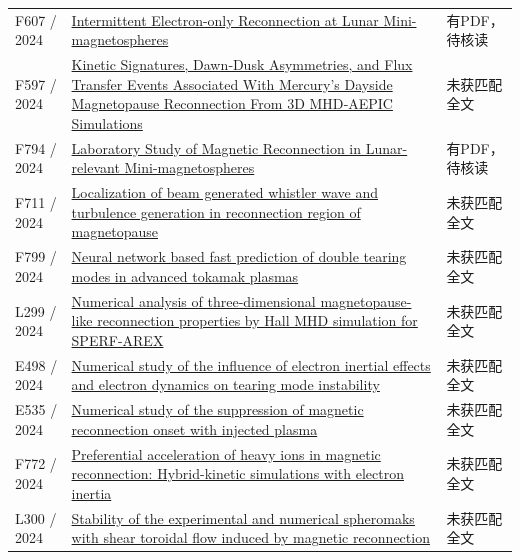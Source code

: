 \begin{longtable}{P{24mm}P{97mm}P{27mm}}
F607 / 2024 & \href{https://doi.org/10.3847/2041-8213/ad2774}{Intermittent Electron-only Reconnection at Lunar Mini-magnetospheres} & 有PDF，待核读\\

F597 / 2024 & \href{https://doi.org/10.1029/2024ja032669}{Kinetic Signatures,  Dawn‐Dusk Asymmetries,  and Flux Transfer Events Associated With Mercury's Dayside Magnetopause Reconnection From 3D MHD‐AEPIC Simulations} & 未获匹配全文\\

F794 / 2024 & \href{https://doi.org/10.3847/1538-4357/ad4fff}{Laboratory Study of Magnetic Reconnection in Lunar-relevant Mini-magnetospheres} & 有PDF，待核读\\

F711 / 2024 & \href{https://doi.org/10.1063/5.0169397}{Localization of beam generated whistler wave and turbulence generation in reconnection region of magnetopause} & 未获匹配全文\\

F799 / 2024 & \href{https://doi.org/10.1063/5.0229910}{Neural network based fast prediction of double tearing modes in advanced tokamak plasmas} & 未获匹配全文\\

L299 / 2024 & \href{https://doi.org/10.1063/5.0213566}{Numerical analysis of three-dimensional magnetopause-like reconnection properties by Hall MHD simulation for SPERF-AREX} & 未获匹配全文\\

E498 / 2024 & \href{https://doi.org/10.1088/1361-6587/ad4e66}{Numerical study of the influence of electron inertial effects and electron dynamics on tearing mode instability} & 未获匹配全文\\

E535 / 2024 & \href{https://doi.org/10.1063/5.0186879}{Numerical study of the suppression of magnetic reconnection onset with injected plasma} & 未获匹配全文\\

F772 / 2024 & \href{https://doi.org/10.1051/0004-6361/202348573}{Preferential acceleration of heavy ions in magnetic reconnection: Hybrid-kinetic simulations with electron inertia} & 未获匹配全文\\

L300 / 2024 & \href{https://doi.org/10.1088/1361-6587/ada1f9}{Stability of the experimental and numerical spheromaks with shear toroidal flow induced by magnetic reconnection} & 未获匹配全文\\


\end{longtable}
